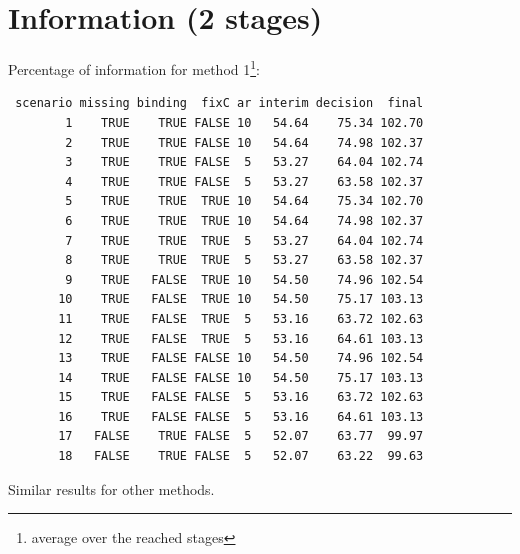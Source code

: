 \documentclass[12pt]{article}
\begin{document}
\clearpage

\section{Information (2 stages)}
\label{sec:org90f29c5}

Percentage of information for method 1\footnote{average over the reached stages}:
\begin{verbatim}
 scenario missing binding  fixC ar interim decision  final
        1    TRUE    TRUE FALSE 10   54.64    75.34 102.70
        2    TRUE    TRUE FALSE 10   54.64    74.98 102.37
        3    TRUE    TRUE FALSE  5   53.27    64.04 102.74
        4    TRUE    TRUE FALSE  5   53.27    63.58 102.37
        5    TRUE    TRUE  TRUE 10   54.64    75.34 102.70
        6    TRUE    TRUE  TRUE 10   54.64    74.98 102.37
        7    TRUE    TRUE  TRUE  5   53.27    64.04 102.74
        8    TRUE    TRUE  TRUE  5   53.27    63.58 102.37
        9    TRUE   FALSE  TRUE 10   54.50    74.96 102.54
       10    TRUE   FALSE  TRUE 10   54.50    75.17 103.13
       11    TRUE   FALSE  TRUE  5   53.16    63.72 102.63
       12    TRUE   FALSE  TRUE  5   53.16    64.61 103.13
       13    TRUE   FALSE FALSE 10   54.50    74.96 102.54
       14    TRUE   FALSE FALSE 10   54.50    75.17 103.13
       15    TRUE   FALSE FALSE  5   53.16    63.72 102.63
       16    TRUE   FALSE FALSE  5   53.16    64.61 103.13
       17   FALSE    TRUE FALSE  5   52.07    63.77  99.97
       18   FALSE    TRUE FALSE  5   52.07    63.22  99.63
\end{verbatim}

Similar results for other methods.
\end{document}
